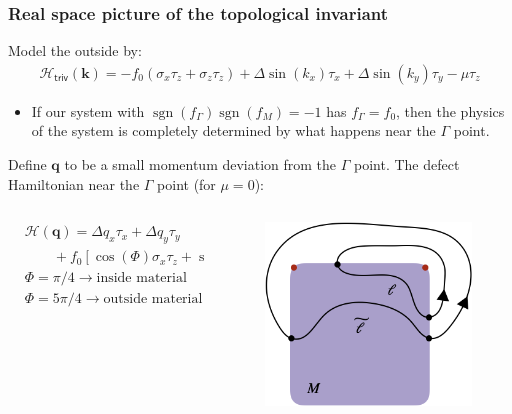 \documentclass{beamer}
\DeclareMathOperator{\sgn}{sgn}
\newcommand{\ms}{\mathsf}
\renewcommand{\(}{\left(}
\renewcommand{\)}{\right)}
\renewcommand{\[}{\left[}
\renewcommand{\]}{\right]}
\begin{document}
\begin{frame}
    \frametitle{Real space picture of the topological invariant}
    Model the outside by: 
    \begin{align*}
        \mathcal H_{\ms{triv}}(\bm{k})= -f_0(\sigma_x\tau_z + \sigma_z \tau_z) +\Delta \sin(k_x)\tau_x + \Delta \sin(k_y)\tau_y -\mu \tau_z
    \end{align*} \pause
    \begin{itemize}
        \item If our system with $\sgn(f_\Gamma)\sgn(f_M) = -1$ has $f_\Gamma = f_0$, then the physics of the system is completely determined by what happens near the $\Gamma$ point. 
    \end{itemize} \pause
    
    Define $\bm q$ to be a small momentum deviation from the $\Gamma$ point. The defect Hamiltonian near the $\Gamma$ point (for $\mu=0$): 
    \begin{columns}
        \begin{column}{0.6\textwidth}
            \begin{align*}
                &\mathcal H(\bm{q})=\Delta q_{x}\tau_x + \Delta q_{y}\tau_y\\ 
                &\qquad + f_0 \left[ \cos (\Phi) \sigma_x \tau_z +\sin(\Phi) \sigma_z \tau_z \right] \\ 
                &\Phi = \pi/4 \rightarrow \text{inside material} \\ 
                &\Phi = 5\pi/4 \rightarrow \text{outside material}
            \end{align*}
            
        \end{column}
        \begin{column}{0.4\textwidth}
            \begin{figure}[]
                \centering
                \includegraphics[scale=0.3]{Real_space_path.png}
            \end{figure}
        \end{column}
    \end{columns}

\end{frame}
\end{document}

